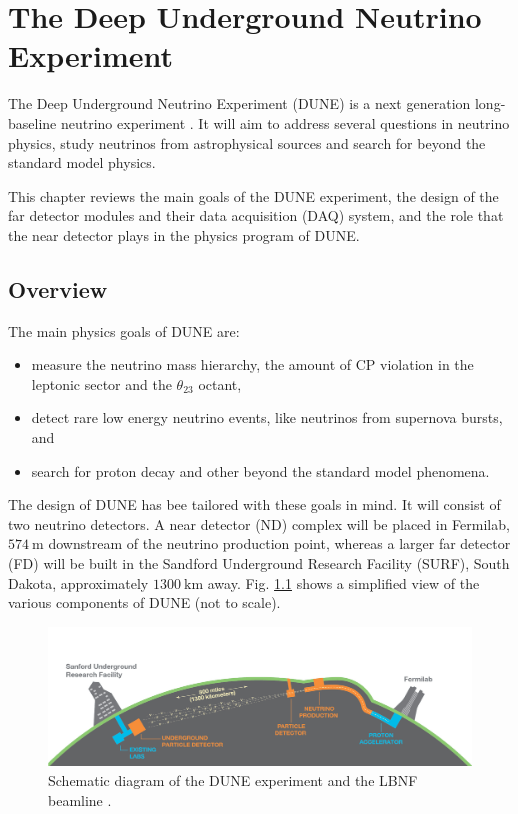 \chapter{The Deep Underground Neutrino Experiment}
\label{chapter:dune}

The Deep Underground Neutrino Experiment (DUNE) is a next generation long-baseline neutrino experiment \cite{DUNE2020TDR1}.  It will aim to address several questions in neutrino physics, study neutrinos from astrophysical sources and search for beyond the standard model physics.

This chapter reviews the main goals of the DUNE experiment, the design of the far detector modules and their data acquisition (DAQ) system, and the role that the near detector plays in the physics program of DUNE.

\section{Overview}

The main physics goals of DUNE are:
\begin{itemize}
	\item measure the neutrino mass hierarchy, the amount of CP violation in the leptonic sector and the $\theta_{23}$ octant,
	\item detect rare low energy neutrino events, like neutrinos from supernova bursts, and
	\item search for proton decay and other beyond the standard model phenomena.
\end{itemize}

The design of DUNE has bee tailored with these goals in mind. It will consist of two neutrino detectors. A near detector (ND) complex will be placed in Fermilab, $574~\mathrm{m}$ downstream of the neutrino production point, whereas a larger far detector (FD) will be built in the Sandford Underground Research Facility (SURF), South Dakota, approximately $1300~\mathrm{km}$ away. Fig. \ref{fig:dune} shows a simplified view of the various components of DUNE (not to scale).

\begin{figure}[t]
	\centering
	\includegraphics[width=0.9\linewidth]{Images/DUNE/FD/dune}
	\caption{Schematic diagram of the DUNE experiment and the LBNF beamline \cite{DUNE2020TDR1}.}
	\label{fig:dune}
\end{figure}

